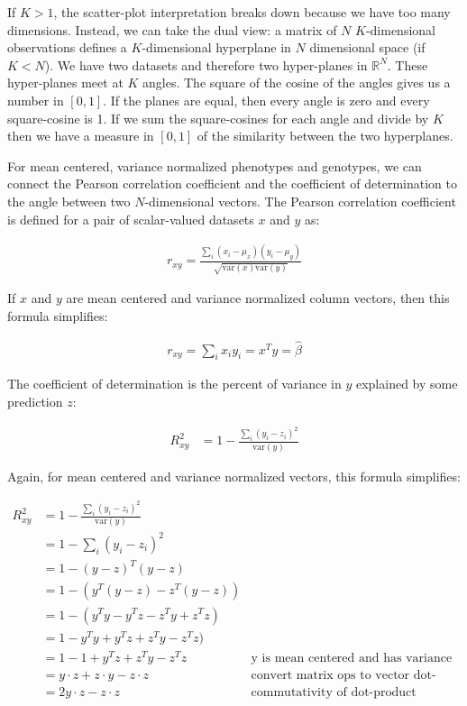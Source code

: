 \documentclass{article}
\newcommand{\R}{\mathbb{R}}
\begin{document}
If $K > 1$, the scatter-plot interpretation breaks down because we have too many
dimensions. Instead, we can take the dual view: a matrix of $N$ $K$-dimensional observations defines
a $K$-dimensional hyperplane in $N$ dimensional space (if $K < N$). We have two datasets and
therefore two hyper-planes in $\R^N$. These hyper-planes meet at $K$ angles. The square of the
cosine of the angles gives us a number in $[0, 1]$. If the planes are equal, then every angle is
zero and every square-cosine is 1. If we sum the square-cosines for each angle and divide by $K$
then we have a measure in $[0, 1]$ of the similarity between the two hyperplanes.

For mean centered, variance normalized phenotypes and genotypes, we can connect the Pearson
correlation coefficient and the coefficient of determination to the angle between two
$N$-dimensional vectors. The Pearson correlation coefficient is defined for a pair of scalar-valued
datasets $x$ and $y$ as:

\begin{align*}
r_{xy} = \frac{\sum_i (x_i - \mu_x) (y_i - \mu_y)}{\sqrt{\text{var}(x)\text{var}(y)}}
\end{align*}

If $x$ and $y$ are mean centered and variance normalized column vectors, then this formula
simplifies:

\begin{align*}
r_{xy} = \sum_i x_i y_i = x^T y = \widehat{\beta}
\end{align*}

The coefficient of determination is the percent of variance in $y$ explained by some prediction $z$:

\begin{align*}
R^2_{xy} &= 1 - \frac{\sum_i (y_i - z_i)^2}{\text{var}(y)}
\end{align*}

Again, for mean centered and variance normalized vectors, this formula simplifies:

\begin{align*}
R^2_{xy} &= 1 - \frac{\sum_i (y_i - z_i)^2}{\text{var}(y)} \\
         &= 1 - \sum_i (y_i - z_i)^2 \\
         &= 1 - (y - z)^T(y - z) \\
         &= 1 - (y^T(y - z) - z^T(y - z)) \\
         &= 1 - (y^Ty - y^Tz - z^Ty + z^Tz) \\
         &= 1 - y^Ty + y^Tz + z^Ty - z^Tz) \\
         &= 1 - 1 + y^Tz + z^Ty - z^Tz & \text{y is mean centered and has variance one}\\
         &= y\cdot z + z\cdot y - z\cdot z & \text{convert matrix ops to vector dot-products}\\
         &= 2 y\cdot z - z \cdot z & \text{commutativity of dot-product}
\end{align*}
\end{document}
